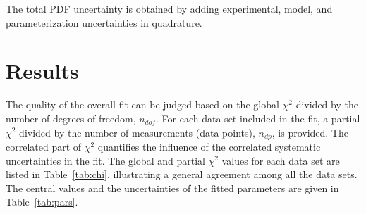 \documentclass[12pt]{article}
\begin{document}
The total PDF uncertainty is obtained by adding experimental, model, and parameterization  uncertainties in quadrature.

\section{Results}
\label{sec:results}

The quality of the overall fit can be judged based on the global $\chi^2$ divided
by the number of degrees of freedom, $n_{dof}$. For each data set included in the fit, a partial $\chi^2$
divided by the number of measurements (data points), $n_{dp}$, is provided. The correlated part of $\chi^2$
quantifies the influence of the correlated systematic uncertainties in the fit. The global and partial $\chi^2$ values 
for each data set are listed in Table~\ref{tab:chi}, illustrating a general agreement among all the data sets. 
The central values and the uncertainties of the fitted parameters are given in Table~\ref{tab:pars}.
\end{document}
